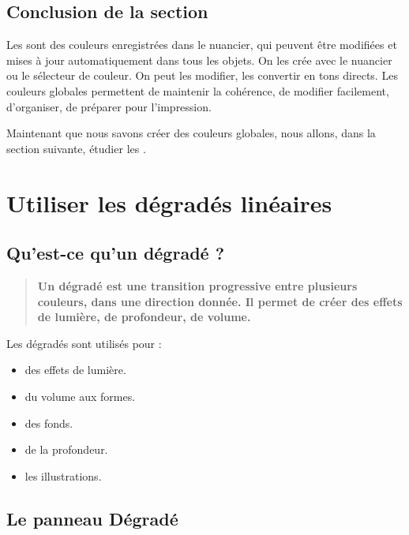\subsection*{Conclusion de la section}

Les  sont des couleurs enregistrées dans le nuancier, qui peuvent être modifiées et mises à jour automatiquement dans tous les objets. On les crée avec le nuancier ou le sélecteur de couleur. On peut les modifier, les convertir en tons directs. Les couleurs globales permettent de maintenir la cohérence, de modifier facilement, d'organiser, de préparer pour l'impression.

Maintenant que nous savons créer des couleurs globales, nous allons, dans la section suivante, étudier les .

\section{Utiliser les dégradés linéaires}

\subsection{Qu'est-ce qu'un dégradé ?}

\begin{quote}
\textbf{Un dégradé est une transition progressive entre plusieurs couleurs, dans une direction donnée. Il permet de créer des effets de lumière, de profondeur, de volume.}
\end{quote}

Les dégradés sont utilisés pour :

\begin{itemize}
    \item {} des effets de lumière.
    \item {} du volume aux formes.
    \item {} des fonds.
    \item {} de la profondeur.
    \item {} les illustrations.
\end{itemize}

\subsection{Le panneau Dégradé}

